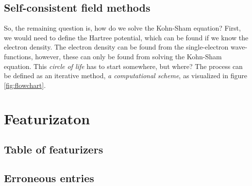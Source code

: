 \section{Self-consistent field methods}
\label{appendix:self-consistent}

So, the remaining question is, how do we solve the Kohn-Sham equation? First, we would need to define the Hartree potential, which can be found if we know the electron density. The electron density can be found from the single-electron wave-functions, however, these can only be found from solving the Kohn-Sham equation. This \textit{circle of life} has to start somewhere, but where? The process can be defined as an iterative method, \textit{a computational scheme}, as visualized in figure \ref{fig:flowchart}.

\clearpage


\clearpage

\chapter{Featurizaton}

\section{Table of featurizers}


\newpage

\section{Erroneous entries}



\clearpage
